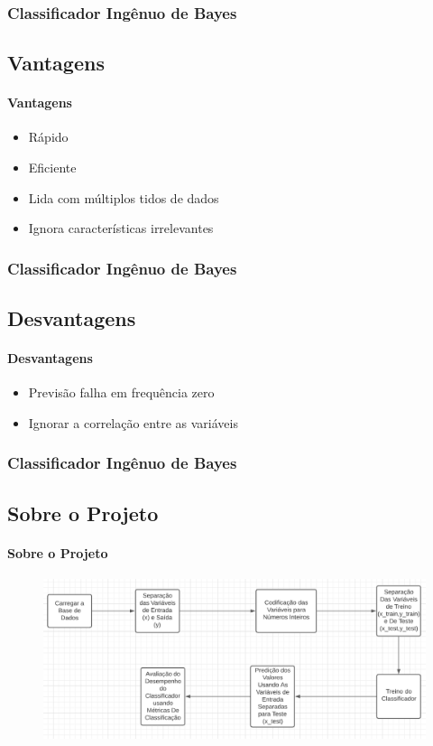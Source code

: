 \documentclass{beamer}
\begin{document}
\begin{frame}
\frametitle{Classificador Ingênuo de Bayes}
\subsection{Vantagens}
\framesubtitle{Vantagens}
\begin{itemize}
\item Rápido
\item Eficiente
\item Lida com múltiplos tidos de dados
\item Ignora características irrelevantes

\end{itemize}
\end{frame}
\begin{frame}
\frametitle{Classificador Ingênuo de Bayes}
\subsection{Desvantagens}
\framesubtitle{Desvantagens}
\begin{itemize}
\item Previsão falha em frequência zero
\item Ignorar a correlação entre as variáveis
\end{itemize}
\end{frame}


\begin{frame}
\frametitle{Classificador Ingênuo de Bayes}
\subsection{Sobre o Projeto}
\framesubtitle{Sobre o Projeto}
\begin{figure}[H]
    \centerline{\includegraphics[width=1.0\textwidth]{IMGS/block1.png}}
\end{figure}    
\end{frame}
\end{document}
